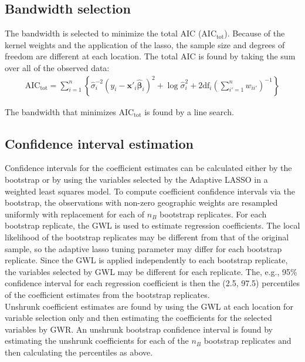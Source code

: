 \documentclass[authoryear, review, 11pt]{elsarticle}
\begin{document}
	\subsection{Bandwidth selection}
	The bandwidth is selected to minimize the total AIC ($\mbox{AIC}_{\mbox{tot}}$). Because of the kernel weights and the application of the lasso, the sample size and degrees of freedom are different at each location. The total AIC is found by taking the sum over all of the observed data:		
	\begin{eqnarray}
		\mbox{AIC}_{\mbox{tot}} = \sum_{i=1}^n \left\{ \hat{\sigma}_i^{-2} \left( y_i - \bm{x}'_i \hat{\bm{\beta}}_i \right)^2 + \log \hat{\sigma}_i^2 + 2 \mbox{df}_i \left(\sum_{i'=1}^n w_{ii'} \right)^{-1} \right\}
	\end{eqnarray}
			
	The bandwidth that minimizes $\mbox{AIC}_{\mbox{tot}}$ is found by a line search.\\
	
	\subsection{Confidence interval estimation}
	 Confidence intervals for the coefficient estimates can be calculated either by the bootstrap \citep{Efron:1986} or by using the variables selected by the Adaptive LASSO in a weighted least squares model. To compute coefficient confidence intervals via the bootstrap, the observations with non-zero geographic weights are resampled uniformly with replacement for each of $n_B$ bootstrap replicates. For each bootstrap replicate, the GWL is used to estimate regression coefficients. The local likelihood of the bootstrap replicates may be different from that of the original sample, so the adaptive lasso tuning parameter may differ for each bootstrap replicate. Since the GWL is applied independently to each bootstrap replicate, the variables selected by GWL may be different for each replicate. The, e.g., 95\% confidence interval for each regression coefficient is then the (2.5, 97.5) percentiles of the coefficient estimates from the bootstrap replicates.\\
	 
	 Unshrunk coefficient estimates are found by using the GWL at each location for variable selection only and then estimating the coefficients for the selected variables by GWR. An unshrunk bootstrap confidence interval is found by estimating the unshrunk coefficients for each of the $n_B$ bootstrap replicates and then calculating the percentiles as above.\\
	 
\end{document}
